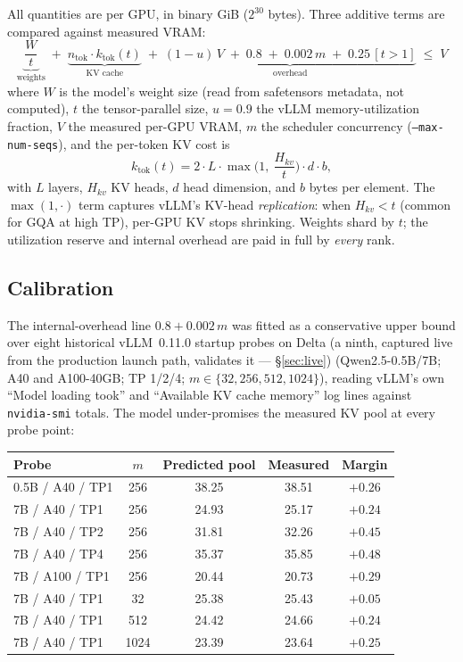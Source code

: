 \documentclass[11pt]{article}
\newcommand{\code}[1]{\texttt{#1}}
\begin{document}
All quantities are per GPU, in binary GiB ($2^{30}$ bytes). Three additive
terms are compared against measured VRAM:
\begin{equation}
\underbrace{\frac{W}{t}}_{\text{weights}}
\;+\;
\underbrace{n_{\text{tok}} \cdot k_{\text{tok}}(t)}_{\text{KV cache}}
\;+\;
\underbrace{(1-u)\,V \;+\; 0.8 \;+\; 0.002\,m \;+\; 0.25\,[t>1]}_{\text{overhead}}
\;\le\; V
\end{equation}
where $W$ is the model's weight size (read from safetensors metadata, not
computed), $t$ the tensor-parallel size, $u=0.9$ the vLLM memory-utilization
fraction, $V$ the measured per-GPU VRAM, $m$ the scheduler concurrency
(\code{--max-num-seqs}), and the per-token KV cost is
\begin{equation}
k_{\text{tok}}(t) = 2 \cdot L \cdot \max\!\Big(1,\ \frac{H_{kv}}{t}\Big) \cdot d \cdot b,
\end{equation}
with $L$ layers, $H_{kv}$ KV heads, $d$ head dimension, and $b$ bytes per
element. The $\max(1,\cdot)$ term captures vLLM's KV-head \emph{replication}:
when $H_{kv} < t$ (common for GQA at high TP), per-GPU KV stops shrinking.
Weights shard by $t$; the utilization reserve and internal overhead are paid in
full by \emph{every} rank.

\subsection{Calibration}

The internal-overhead line $0.8 + 0.002\,m$ was fitted as a conservative upper
bound over eight historical vLLM~0.11.0 startup probes on Delta (a ninth,
captured live from the production launch path, validates it --- \S\ref{sec:live}) (Qwen2.5-0.5B/7B;
A40 and A100-40GB; TP 1/2/4; $m \in \{32,256,512,1024\}$), reading vLLM's own
``Model loading took'' and ``Available KV cache memory'' log lines against
\code{nvidia-smi} totals. The model under-promises the measured KV pool at
every probe point:

\begin{center}
\begin{tabular}{lcccc}
\toprule
Probe & $m$ & Predicted pool & Measured & Margin \\
\midrule
0.5B / A40 / TP1 & 256 & 38.25 & 38.51 & $+0.26$ \\
7B / A40 / TP1 & 256 & 24.93 & 25.17 & $+0.24$ \\
7B / A40 / TP2 & 256 & 31.81 & 32.26 & $+0.45$ \\
7B / A40 / TP4 & 256 & 35.37 & 35.85 & $+0.48$ \\
7B / A100 / TP1 & 256 & 20.44 & 20.73 & $+0.29$ \\
7B / A40 / TP1 & 32 & 25.38 & 25.43 & $+0.05$ \\
7B / A40 / TP1 & 512 & 24.42 & 24.66 & $+0.24$ \\
7B / A40 / TP1 & 1024 & 23.39 & 23.64 & $+0.25$ \\
\bottomrule
\end{tabular}
\end{center}
\end{document}
